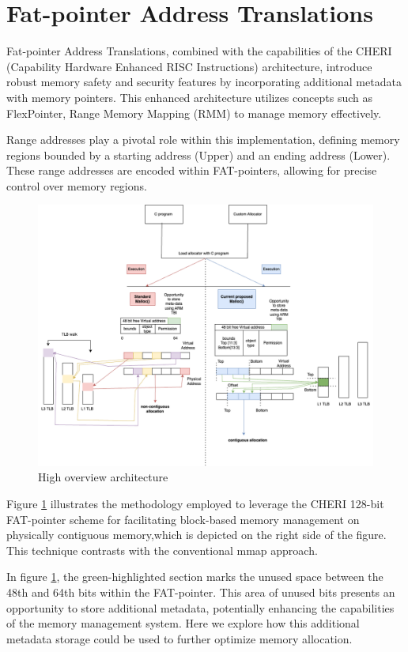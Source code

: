 \documentclass[11pt]{article}
\author{Akilan}
\date{\today}
\title{}
\begin{document}
\tableofcontents


\section{Fat-pointer Address Translations}
\label{sec:org81645fa}

Fat-pointer Address Translations, combined with the capabilities of the CHERI (Capability Hardware Enhanced RISC Instructions) 
architecture, introduce robust memory safety and security features by incorporating additional metadata 
with memory pointers. This enhanced architecture utilizes concepts such as FlexPointer, 
Range Memory Mapping (RMM) to manage memory effectively.

Range addresses play a pivotal role within this implementation, defining memory 
regions bounded by a starting address (Upper) and an ending address (Lower). 
These range addresses are encoded within FAT-pointers, allowing for precise 
control over memory regions.

\begin{figure}[htbp]
\centering
\includegraphics[width=.9\linewidth]{diagram/HighOverviewArchitecture.drawio.png}
\caption{\label{fig:org3f8fa4f}High overview architecture}
\end{figure}

Figure \ref{fig:org3f8fa4f} illustrates
the methodology employed to leverage the CHERI 
128-bit FAT-pointer scheme for facilitating
block-based memory management on physically
contiguous memory,which is depicted on the
right side of the figure. 
This technique contrasts with the
conventional mmap approach.

In figure \ref{fig:org3f8fa4f}, the green-highlighted
section marks the unused space between the 48th and 64th bits
within the FAT-pointer. This area of unused bits
presents an opportunity to store additional metadata,
potentially enhancing the capabilities of the
memory management system. 
Here we explore how this additional
metadata storage could be used to further
optimize memory allocation.
\end{document}
